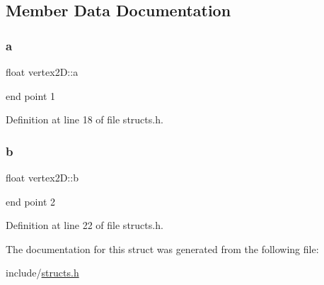\subsection{Member Data Documentation}
\mbox{\label{structvertex2_d_afef4fe9f03de3deeafb9806f144bcd28}} 
\subsubsection{\texorpdfstring{a}{a}}
{\footnotesize\ttfamily float vertex2\+D\+::a}

end point 1 

Definition at line 18 of file structs.\+h.

\mbox{\label{structvertex2_d_a7f6118b6b5c6112a2538abfe341e420e}} 
\subsubsection{\texorpdfstring{b}{b}}
{\footnotesize\ttfamily float vertex2\+D\+::b}

end point 2 

Definition at line 22 of file structs.\+h.



The documentation for this struct was generated from the following file\+:\begin{DoxyCompactItemize}
\item 
include/\mbox{\hyperlink{structs_8h}{structs.\+h}}\end{DoxyCompactItemize}
